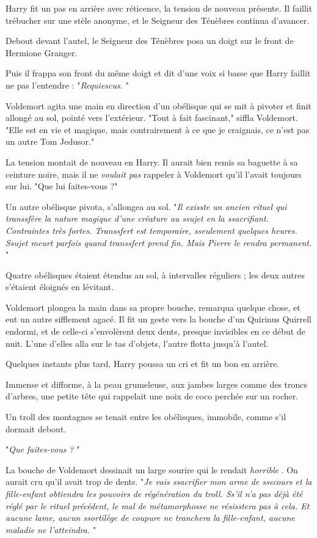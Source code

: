 Harry fit un pas en arrière avec réticence, la tension de nouveau présente. Il faillit trébucher sur une stèle anonyme, et le Seigneur des Ténèbres continua d'avancer.

Debout devant l'autel, le Seigneur des Ténèbres posa un doigt sur le front de Hermione Granger.

Puis il frappa son front du même doigt et dit d'une voix si basse que Harry faillit ne pas l'entendre : "\emph{Requiescus.} "

Voldemort agita une main en direction d'un obélisque qui se mit à pivoter et finit allongé au sol, pointé vers l'extérieur. "Tout à fait fascinant," siffla Voldemort. "Elle est en vie et magique, mais contrairement à ce que je craignais, ce n'est pas un autre Tom Jedusor."

La tension montait de nouveau en Harry. Il aurait bien remis sa baguette à sa ceinture noire, mais il ne \emph{voulait pas}  rappeler à Voldemort qu'il l'avait toujours sur lui. "Que lui faites-vous ?"

Un autre obélisque pivota, s'allongea au sol. "\emph{Il exisste un ancien rituel qui transsfère la nature magique d'une créature au ssujet en la ssacrifiant. Contraintes très fortes. Transsfert est temporaire, sseulement quelques heures. Ssujet meurt parfois quand transsfert prend fin. Mais Pierre le rendra permanent.} "

Quatre obélisques étaient étendus au sol, à intervalles réguliers ; les deux autres s'étaient éloignés en lévitant.

Voldemort plongea la main dans sa propre bouche, remarqua quelque chose, et eut un autre sifflement agacé. Il fit un geste vers la bouche d'un Quirinus Quirrell endormi, et de celle-ci s'envolèrent deux dents, presque invisibles en ce début de nuit. L'une d'elles alla sur le tas d'objets, l'autre flotta jusqu'à l'autel.

Quelques instants plus tard, Harry poussa un cri et fit un bon en arrière.

Immense et difforme, à la peau grumeleuse, aux jambes larges comme des troncs d'arbres, une petite tête qui rappelait une noix de coco perchée sur un rocher.

Un troll des montagnes se tenait entre les obélisques, immobile, comme s'il dormait debout.

"\emph{Que faites-vous ?} "

La bouche de Voldemort dessinait un large sourire qui le rendait \emph{horrible} . On aurait cru qu'il avait trop de dents. "\emph{Je vais ssacrifier mon arme de ssecours et la fille-enfant obtiendra les pouvoirs de régénération du troll. Ss'il n'a pas déjà été réglé par le rituel précédent, le mal de métamorphosse ne résisstera pas à cela. Et aucune lame, aucun ssortilège de coupure ne tranchera la fille-enfant, aucune maladie ne l'atteindra.} "

